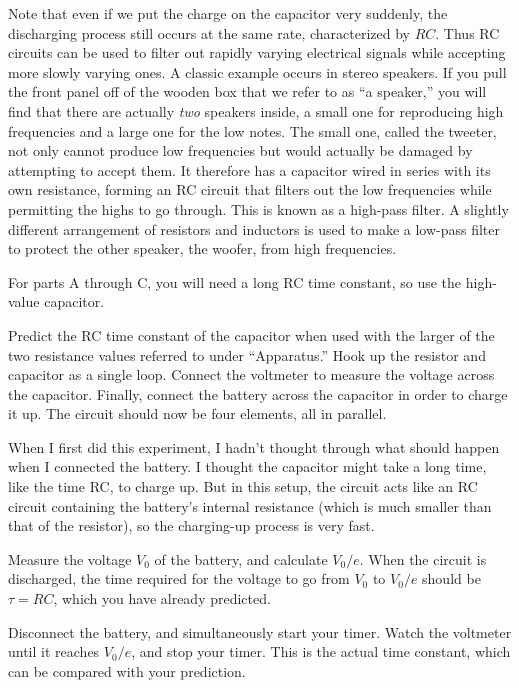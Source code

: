 Note that even if we put the charge on the capacitor very
suddenly, the discharging process still occurs at the same
rate, characterized by $RC$. Thus RC circuits can be used to
filter out rapidly varying electrical signals while
accepting more slowly varying ones. A classic example occurs
in stereo speakers. If you pull the front panel off of the
wooden box that we refer to as ``a speaker,'' you will find
that there are actually \emph{two} speakers inside, a small
one for reproducing high frequencies and a large one for the
low notes. The small one, called the tweeter, not only
cannot produce low frequencies but would actually be damaged
by attempting to accept them. It therefore has a capacitor
wired in series with its own resistance, forming an RC
circuit that filters out the low frequencies while
permitting the highs to go through. This is known as a
high-pass filter. A slightly different arrangement of
resistors and inductors is used to make a low-pass filter
to protect the other speaker, the woofer, from high frequencies. 

\observations


For parts A through C, you will need a long RC time constant,
so use the high-value capacitor.

Predict the RC time constant of the capacitor when used with
the larger of the two resistance values referred to under ``Apparatus.'' Hook up the resistor
and capacitor as a single loop. Connect the voltmeter to measure
the voltage across the capacitor. Finally, connect the battery
across the capacitor in order to charge it up. The circuit should
now be four elements, all in parallel.

When I first did this experiment, I hadn't thought through what
should happen when I connected the battery. I thought the capacitor
might take a long time, like the time RC, to charge up. But in this
setup, the circuit acts like an RC circuit containing the battery's
internal resistance (which is much smaller than that of the resistor),
so the charging-up process is very fast.

Measure the voltage $V_0$ of the battery, and calculate $V_0/e$. When
the circuit is discharged, the time required for the voltage to go from
$V_0$ to $V_0/e$ should be $\tau=RC$, which you have already predicted.

Disconnect the battery, and simultaneously start your timer.
Watch the voltmeter until it reaches $V_0/e$, and stop your timer.
This is the actual time constant, which can be compared with your
prediction.

